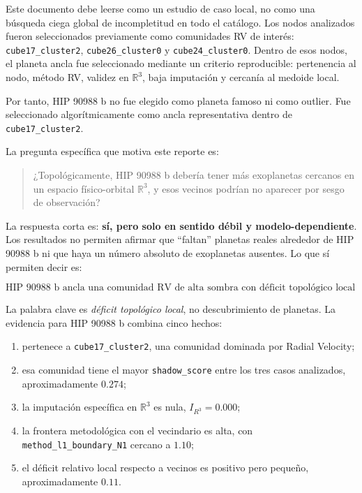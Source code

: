 \documentclass[11pt]{article}
\begin{document}
Este documento debe leerse como un estudio de caso local, no como una búsqueda ciega global de incompletitud en todo el catálogo. Los nodos analizados fueron seleccionados previamente como comunidades RV de interés: \texttt{cube17\_cluster2}, \texttt{cube26\_cluster0} y \texttt{cube24\_cluster0}. Dentro de esos nodos, el planeta ancla fue seleccionado mediante un criterio reproducible: pertenencia al nodo, método RV, validez en $\mathbb{R}^3$, baja imputación y cercanía al medoide local.

Por tanto, HIP 90988 b no fue elegido como planeta famoso ni como outlier. Fue seleccionado algorítmicamente como ancla representativa dentro de \texttt{cube17\_cluster2}.

La pregunta específica que motiva este reporte es:

\begin{quote}
¿Topológicamente, HIP 90988 b debería tener más exoplanetas cercanos en un espacio físico-orbital $\mathbb{R}^3$, y esos vecinos podrían no aparecer por sesgo de observación?
\end{quote}

La respuesta corta es: \textbf{sí, pero solo en sentido débil y modelo-dependiente}. Los resultados no permiten afirmar que ``faltan'' planetas reales alrededor de HIP 90988 b ni que haya un número absoluto de exoplanetas ausentes. Lo que sí permiten decir es:

\[
\boxed{
\text{HIP 90988 b ancla una comunidad RV de alta sombra con déficit topológico local débil de vecinos compatibles.}
}
\]

La palabra clave es \emph{déficit topológico local}, no descubrimiento de planetas. La evidencia para HIP 90988 b combina cinco hechos:

\begin{enumerate}
    \item pertenece a \texttt{cube17\_cluster2}, una comunidad dominada por Radial Velocity;
    \item esa comunidad tiene el mayor \texttt{shadow\_score} entre los tres casos analizados, aproximadamente $0.274$;
    \item la imputación específica en $\mathbb{R}^3$ es nula, $I_{R^3}=0.000$;
    \item la frontera metodológica con el vecindario es alta, con \texttt{method\_l1\_boundary\_N1} cercano a $1.10$;
    \item el déficit relativo local respecto a vecinos es positivo pero pequeño, aproximadamente $0.11$.
\end{enumerate}
\end{document}
